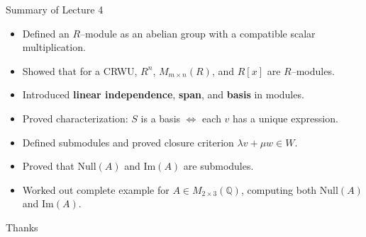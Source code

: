\begin{frame}{Summary of Lecture 4}
\begin{itemize}
  \item Defined an $R$–module as an abelian group with a compatible scalar multiplication.
  \item Showed that for a CRWU, $R^n$, $M_{m\times n}(R)$, and $R[x]$ are $R$–modules.
  \item Introduced \textbf{linear independence}, \textbf{span}, and \textbf{basis} in modules.
  \item Proved characterization: $S$ is a basis $\iff$ each $v$ has a unique expression.
  \item Defined submodules and proved closure criterion $\lambda v+\mu w\in W$.
  \item Proved that $\mathrm{Null}(A)$ and $\mathrm{Im}(A)$ are submodules.
  \item Worked out complete example for $A\in M_{2\times3}(\mathbb{Q})$, computing both $\mathrm{Null}(A)$ and $\mathrm{Im}(A)$.
\end{itemize}
\end{frame}

\begin{frame}{Thanks}
  \cmcendframe
\end{frame}


